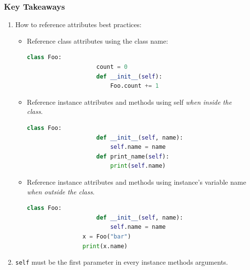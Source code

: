\documentclass{beamer}
\begin{document}
%
%
\begin{frame}[fragile]
    \frametitle{Key Takeaways}
    \begin{enumerate}
        \item How to reference attributes best practices:
            \begin{itemize}
                \item Reference class attributes using the class name:
                    \vspace{-0.2cm}
                    \begin{lstlisting}[language=python, autogobble, basicstyle=\tiny]
                class Foo:
                    count = 0
                    def __init__(self):
                        Foo.count += 1
                    \end{lstlisting}
                    \vfill
                \item Reference instance attributes and methods using self \textit{when inside the class}.
                    \vspace{-0.2cm}
                    \begin{lstlisting}[language=python, autogobble, basicstyle=\tiny]
                class Foo:
                    def __init__(self, name):
                        self.name = name
                    def print_name(self):
                        print(self.name)
                    \end{lstlisting}
                    \vfill
                \item Reference instance attributes and methods using instance's variable name \textit{when outside the class}.
                    \vspace{-0.2cm}
                    \begin{lstlisting}[language=python, autogobble, basicstyle=\tiny]
                class Foo:
                    def __init__(self, name):
                        self.name = name
                x = Foo("bar")
                print(x.name)
                    \end{lstlisting}
                    \vfill
            \end{itemize}
        \item \lstinline|self| must be the first parameter in every instance methods arguments.
    \end{enumerate}
\end{frame}
\end{document}
